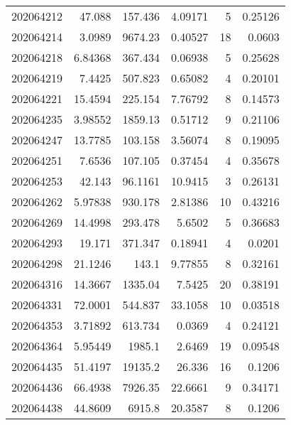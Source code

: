 \begin{tabular}{rrrrrr}
 202064212 &         47.088   &      157.436  &            4.09171 &           5 & 0.25126 \\
 202064214 &          3.0989  &     9674.23   &            0.40527 &          18 & 0.0603  \\
 202064218 &          6.84368 &      367.434  &            0.06938 &           5 & 0.25628 \\
 202064219 &          7.4425  &      507.823  &            0.65082 &           4 & 0.20101 \\
 202064221 &         15.4594  &      225.154  &            7.76792 &           8 & 0.14573 \\
 202064235 &          3.98552 &     1859.13   &            0.51712 &           9 & 0.21106 \\
 202064247 &         13.7785  &      103.158  &            3.56074 &           8 & 0.19095 \\
 202064251 &          7.6536  &      107.105  &            0.37454 &           4 & 0.35678 \\
 202064253 &         42.143   &       96.1161 &           10.9415  &           3 & 0.26131 \\
 202064262 &          5.97838 &      930.178  &            2.81386 &          10 & 0.43216 \\
 202064269 &         14.4998  &      293.478  &            5.6502  &           5 & 0.36683 \\
 202064293 &         19.171   &      371.347  &            0.18941 &           4 & 0.0201  \\
 202064298 &         21.1246  &      143.1    &            9.77855 &           8 & 0.32161 \\
 202064316 &         14.3667  &     1335.04   &            7.5425  &          20 & 0.38191 \\
 202064331 &         72.0001  &      544.837  &           33.1058  &          10 & 0.03518 \\
 202064353 &          3.71892 &      613.734  &            0.0369  &           4 & 0.24121 \\
 202064364 &          5.95449 &     1985.1    &            2.6469  &          19 & 0.09548 \\
 202064435 &         51.4197  &    19135.2    &           26.336   &          16 & 0.1206  \\
 202064436 &         66.4938  &     7926.35   &           22.6661  &           9 & 0.34171 \\
 202064438 &         44.8609  &     6915.8    &           20.3587  &           8 & 0.1206  \\

\end{tabular}
